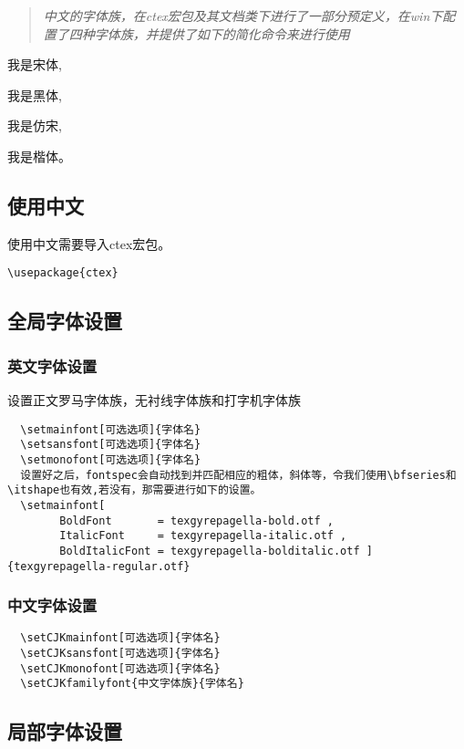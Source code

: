 \begin{quote}
  \itshape
  中文的字体族，在ctex宏包及其文档类下进行了一部分预定义，在win下配置了四种字体族，并提供了如下的简化命令来进行使用
\end{quote}
\begin{codeshow}
  {\songti 我是宋体},

  {\heiti 我是黑体},

  {\fangsong 我是仿宋},

  {\kaishu 我是楷体}。
\end{codeshow}


\subsection{使用中文}\label{subsec:chinese}
使用中文需要导入ctex宏包。
\begin{lstlisting}
\usepackage{ctex}
\end{lstlisting}

\subsection{全局字体设置}\label{subsec:global}
\subsubsection{英文字体设置}
设置正文罗马字体族，无衬线字体族和打字机字体族
\begin{lstlisting}
  \setmainfont[可选选项]{字体名}
  \setsansfont[可选选项]{字体名}
  \setmonofont[可选选项]{字体名}
  设置好之后，fontspec会自动找到并匹配相应的粗体，斜体等，令我们使用\bfseries和\itshape也有效,若没有，那需要进行如下的设置。
  \setmainfont[
        BoldFont       = texgyrepagella-bold.otf ,
        ItalicFont     = texgyrepagella-italic.otf ,
        BoldItalicFont = texgyrepagella-bolditalic.otf ]{texgyrepagella-regular.otf}
\end{lstlisting}

\subsubsection{中文字体设置}
\begin{lstlisting}
  \setCJKmainfont[可选选项]{字体名}
  \setCJKsansfont[可选选项]{字体名}
  \setCJKmonofont[可选选项]{字体名}
  \setCJKfamilyfont{中文字体族}{字体名}
\end{lstlisting}

\subsection{局部字体设置}\label{subsec:local}
